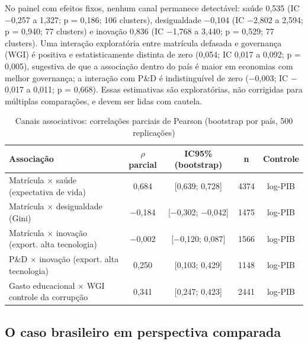 \documentclass[12pt,a4paper]{article}
\begin{document}
No painel com efeitos fixos, nenhum canal permanece detectável: saúde 0,535 (IC $-$0,257 a 1,327; p = 0,186; 106 clusters), desigualdade $-$0,104 (IC $-$2,802 a 2,594; p = 0,940; 77 clusters) e inovação 0,836 (IC $-$1,768 a 3,440; p = 0,529; 77 clusters). Uma interação exploratória entre matrícula defasada e governança (WGI) é positiva e estatisticamente distinta de zero (0,054; IC 0,017 a 0,092; p = 0,005), sugestiva de que a associação dentro do país é maior em economias com melhor governança; a interação com P\&D é indistinguível de zero ($-$0,003; IC $-$0,017 a 0,011; p = 0,668). Essas estimativas são exploratórias, não corrigidas para múltiplas comparações, e devem ser lidas com cautela.

\begin{table}[htbp]
\centering
\caption{Canais associativos: correlações parciais de Pearson (bootstrap por país, 500 replicações)}
\label{tab:canais}
\small
\begin{tabular}{>{\raggedright\arraybackslash}p{5.2cm}cccc}
\toprule
Associação & $\rho$ parcial & IC95\% (bootstrap) & n & Controle \\
\midrule
Matrícula $\times$ saúde (expectativa de vida) & 0,684 & [0,639; 0,728] & 4374 & log-PIB \\
Matrícula $\times$ desigualdade (Gini) & $-$0,184 & [$-$0,302; $-$0,042] & 1475 & log-PIB \\
Matrícula $\times$ inovação (export. alta tecnologia) & $-$0,002 & [$-$0,120; 0,087] & 1566 & log-PIB \\
P\&D $\times$ inovação (export. alta tecnologia) & 0,250 & [0,103; 0,429] & 1148 & log-PIB \\
Gasto educacional $\times$ WGI controle da corrupção & 0,341 & [0,247; 0,423] & 2441 & log-PIB \\
\bottomrule
\end{tabular}
\par{}
\end{table}

\subsection{O caso brasileiro em perspectiva comparada}
\end{document}
